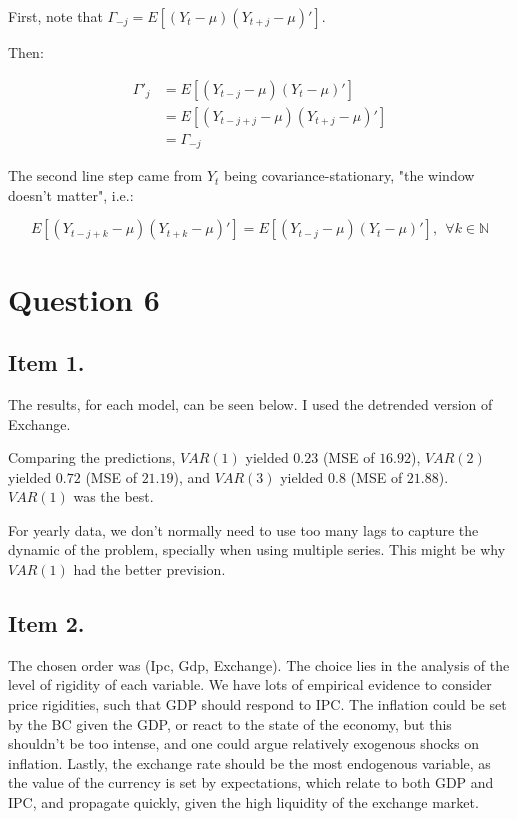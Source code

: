 \documentclass[12pt]{article}
\begin{document}
First, note that $\Gamma_{-j} = E[(Y_t - \mu)(Y_{t+j} - \mu)']$.

Then:

\begin{align*}
    \Gamma'_j &= E[(Y_{t-j} - \mu)(Y_t - \mu)']\\
    &= E[(Y_{t-j + j} - \mu)(Y_{t + j} - \mu)']\\
    &= \Gamma_{-j}
\end{align*}

The second line step came from ${Y_t}$ being covariance-stationary, "the window doesn't matter", i.e.:

$$
E[(Y_{t-j + k} - \mu)(Y_{t + k} - \mu)'] = E[(Y_{t-j} - \mu)(Y_{t} - \mu)'],~~ \forall k \in \mathbb{N}
$$



\section*{Question 6}

\subsection*{Item 1.}

The results, for each model, can be seen below. I used the detrended version of Exchange.





Comparing the predictions, $VAR(1)$ yielded $0.23$ (MSE of $16.92$), $VAR(2)$ yielded $0.72$ (MSE of $21.19$), and $VAR(3)$ yielded $0.8$ (MSE of $21.88$). $VAR(1)$ was the best.

For yearly data, we don't normally need to use too many lags to capture the dynamic of the problem, specially when using multiple series. This might be why $VAR(1)$ had the better prevision.


\subsection*{Item 2.}

The chosen order was (Ipc, Gdp, Exchange). The choice lies in the analysis of the level of rigidity of each variable. We have lots of empirical evidence to consider price rigidities, such that GDP should respond to IPC. The inflation could be set by the BC given the GDP, or react to the state of the economy, but this shouldn't be too intense, and one could argue relatively exogenous shocks on inflation. Lastly, the exchange rate should be the most endogenous variable, as the value of the currency is set by expectations, which relate to both GDP and IPC, and propagate quickly, given the high liquidity of the exchange market.
\end{document}
